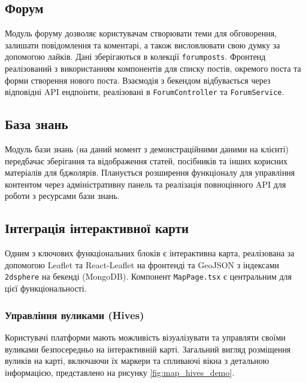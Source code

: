 \subsection{Форум}
Модуль форуму дозволяє користувачам створювати теми для обговорення, залишати повідомлення та коментарі, а також висловлювати свою думку за допомогою лайків. Дані зберігаються в колекції \texttt{forumposts}. Фронтенд реалізований з використанням компонентів для списку постів, окремого поста та форми створення нового поста. Взаємодія з бекендом відбувається через відповідні API ендпоінти, реалізовані в \texttt{ForumController} та \texttt{ForumService}.

\subsection{База знань}
Модуль бази знань (на даний момент з демонстраційними даними на клієнті) передбачає зберігання та відображення статей, посібників та інших корисних матеріалів для бджолярів. Планується розширення функціоналу для управління контентом через адміністративну панель та реалізація повноцінного API для роботи з ресурсами бази знань.

\subsection{Інтеграція інтерактивної карти}
Одним з ключових функціональних блоків є інтерактивна карта, реалізована за допомогою Leaflet та React-Leaflet на фронтенді та GeoJSON з індексами \texttt{2dsphere} на бекенді (MongoDB). Компонент \texttt{MapPage.tsx} є центральним для цієї функціональності.

\subsubsection{Управління вуликами (Hives)}
Користувачі платформи мають можливість візуалізувати та управляти своїми вуликами безпосередньо на інтерактивній карті. Загальний вигляд розміщення вуликів на карті, включаючи їх маркери та спливаючі вікна з детальною інформацією, представлено на рисунку \ref{fig:map_hives_demo}.

